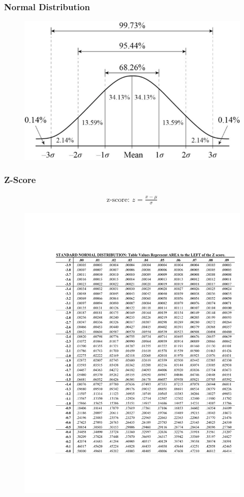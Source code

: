 \documentclass[12pt]{article}
\numberwithin{equation}{section}
\begin{document}
\subsubsection{Normal Distribution}
\begin{figure}[!ht]
    \centering
    \includegraphics[width=0.8\linewidth]{figures/normalcurve.png}
\end{figure}

\subsubsection{Z-Score}
\begin{gather}
    \text{z-score: } z = \frac{x-\mu}{\sigma}
\end{gather}

\begin{figure}[!ht]
    \centering
    \includegraphics[page=1, width=0.9\linewidth, trim=4cm 4cm 1.25cm 4cm]{standardnormaltable.pdf}
    \label{zscore}
\end{figure}
\end{document}
